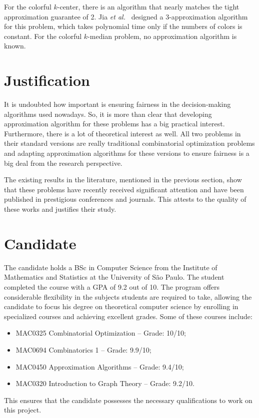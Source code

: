 \documentclass[12pt]{article}
\begin{document}
For the colorful $k$-center, there is an algorithm that nearly matches the tight approximation guarantee of 2. Jia \emph{et al.}~\cite{JSS2020} designed a 3-approximation algorithm for this problem, which takes polynomial time only if the numbers of colors is constant. For the colorful $k$-median problem, no approximation algorithm is known.

\section{Justification}
It is undoubted how important is ensuring fairness in the decision-making algorithms used nowadays. 
So, it is more than clear that developing approximation algorithm for these problems has a big practical interest. 
Furthermore, there is a lot of theoretical interest as well.
All two problems in their standard versions are really traditional combinatorial optimization problems and adapting approximation algorithms for these versions to ensure fairness is a big deal from the research perspective.

The existing results in the literature, mentioned in the previous section, show that these problems have recently received significant attention and have been published in prestigious conferences and journals. This attests to the quality of these works and justifies their study.


\section{Candidate}
The candidate holds a BSc in Computer Science from the Institute of Mathematics and Statistics at the University of São Paulo.
The student completed the course with a GPA of 9.2 out of 10. The program offers considerable flexibility in the subjects students are required to take, allowing the candidate to focus his degree on theoretical computer science by enrolling in specialized courses and achieving excellent grades. Some of these courses include:
\begin{itemize} 
    \item MAC0325 Combinatorial Optimization – Grade: 10/10; 
    \item MAC0694 Combinatorics 1 – Grade: 9.9/10; 
    \item MAC0450 Approximation Algorithms – Grade: 9.4/10; 
    \item MAC0320 Introduction to Graph Theory – Grade: 9.2/10. 
\end{itemize}
This ensures that the candidate possesses the necessary qualifications to work on this project.
\end{document}
